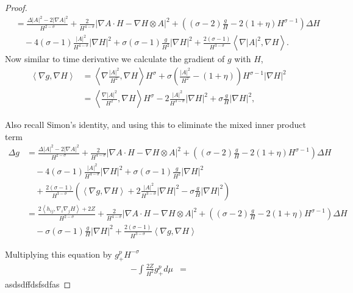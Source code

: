 \begin{proof}
\begin{align*}
        & = \frac{\Delta |A|^{2}- 2|\nabla A|^{2}}{H^{2-\sigma}} + \frac{2}{H^{4-\sigma}}| \nabla A \cdot H - \nabla H \otimes A|^{2} + \left( (\sigma-2)\frac{g}{H} - 2(1+\eta)H^{\sigma-1} \right)\Delta H \\
        & \quad - 4(\sigma -1) \frac{|A|^{2}}{H^{4-\sigma}} |\nabla H|^{2} + \sigma(\sigma -1)\frac{g}{H^{2}}|\nabla H|^{2}+ \frac{2(\sigma -1)}{H^{3-\sigma}} \left< \nabla |A|^{2}, \nabla H \right>.
    \end{align*}
    Now similar to time derivative we calculate the gradient of $ g $ with $ H $, \begin{align*}
        \left< \nabla g, \nabla H \right> & = \left< \nabla\frac{ |A|^{2}}{H^{2}}, \nabla H \right>H^{\sigma} + \sigma\left( \frac{|A|^{2}}{H^{2}} - (1+ \eta) \right) H^{\sigma-1}| \nabla H|^{2} \\
        & = \left< \frac{\nabla |A|^{2}}{H^{2}}, \nabla H \right>H^{\sigma} -2 \frac{|A|^{2}}{H^{3-\sigma}}|\nabla H|^{2}+ \sigma \frac{g}{H}| \nabla H|^{2},
    \end{align*}

    Also recall Simon's identity, and using this to eliminate the mixed inner product term 
    \begin{align*}
        \Delta g & = \frac{\Delta |A|^{2}- 2|\nabla A|^{2}}{H^{2-\sigma}} + \frac{2}{H^{4-\sigma}}| \nabla A \cdot H - \nabla H \otimes A|^{2} + \left( (\sigma-2)\frac{g}{H} - 2(1+\eta)H^{\sigma-1} \right)\Delta H \\
        & \quad - 4(\sigma -1) \frac{|A|^{2}}{H^{4-\sigma}} |\nabla H|^{2} + \sigma(\sigma -1)\frac{g}{H^{2}}|\nabla H|^{2} \\
        & \quad + \frac{2(\sigma -1)}{H^{3-\sigma}}\left( \left< \nabla g, \nabla H \right> +2 \frac{|A|^{2}}{H^{3-\sigma}}|\nabla H|^{2} - \sigma \frac{g}{H}|\nabla H|^{2} \right)  \\
        & = \frac{2\left< h_{ij}, \nabla_{i}\nabla_{j}H \right>+2Z}{H^{2-\sigma}} + \frac{2}{H^{4-\sigma}}| \nabla A \cdot H - \nabla H \otimes A|^{2} + \left( (\sigma-2)\frac{g}{H} - 2(1+\eta)H^{\sigma-1} \right)\Delta H \\
        & \quad - \sigma(\sigma-1) \frac{g}{H}|\nabla H|^{2} + \frac{2(\sigma -1)}{H^{3-\sigma}}\left< \nabla g, \nabla H \right>
    \end{align*}

    Multiplying this equation by $ g_{+}^{p}H^{-\sigma} $ \begin{align*}
        - \int \frac{2Z}{H^{2}}g_{+}^{p} d \mu & = 
    \end{align*}
    asdsdffdsfsdfas
\end{proof}